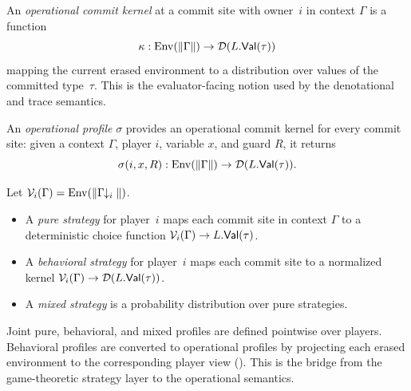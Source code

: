 \documentclass[11pt]{article}
\begin{document}
\begin{definition}
An \emph{operational commit kernel} at a commit site with owner~$i$ in context
$\Gamma$ is a function
\[
  \kappa : \mathrm{Env}(\|\Gamma\|) \to \mathcal{D}(L.\mathsf{Val}(\tau))
\]
mapping the current erased environment to a distribution over values of the
committed type~$\tau$. This is the evaluator-facing notion used by the
denotational and trace semantics.
\end{definition}

\begin{definition}
An \emph{operational profile} $\sigma$ provides an operational commit kernel for
every commit site: given a context $\Gamma$, player $i$, variable $x$, and
guard $R$, it returns
\[
  \sigma(i, x, R) : \mathrm{Env}(\|\Gamma\|) \to \mathcal{D}(L.\mathsf{Val}(\tau)).
\]
\end{definition}

\begin{definition}
Let $\mathcal{V}_i(\Gamma) = \mathrm{Env}(\|\Gamma\!\!\downarrow_i\|)$.
\begin{itemize}[nosep]
\item A \emph{pure strategy} for player~$i$ maps each commit site in context
      $\Gamma$ to a deterministic choice function
      $\mathcal{V}_i(\Gamma) \to L.\mathsf{Val}(\tau)$.
\item A \emph{behavioral strategy} for player~$i$ maps each commit site to a
      normalized kernel
      $\mathcal{V}_i(\Gamma) \to \mathcal{D}(L.\mathsf{Val}(\tau))$.
\item A \emph{mixed strategy} is a probability distribution over pure
      strategies.
\end{itemize}
Joint pure, behavioral, and mixed profiles are defined pointwise over players.
Behavioral profiles are converted to operational profiles by projecting each
erased environment to the corresponding player view
(). This is the bridge from the game-theoretic
strategy layer to the operational semantics.
\end{definition}
\end{document}
